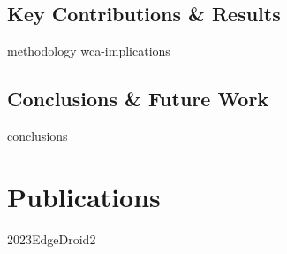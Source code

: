 \documentclass[electronic,oldfontcommands]{kthesis}
\begin{document}
\chapter{Key Contributions \& Results}\label{chap:contributions}
{methodology}
{wca-implications}

\chapter{Conclusions \& Future Work}\label{chap:conclusions}
{conclusions}

\renewcommand\chaptername{\newchaptername}
\renewcommand*{\thechapter}{\Alph{chapter}}
\part{Publications}\label{part:publications}






{2023EdgeDroid2}

\backmatter%
%

\end{document}
